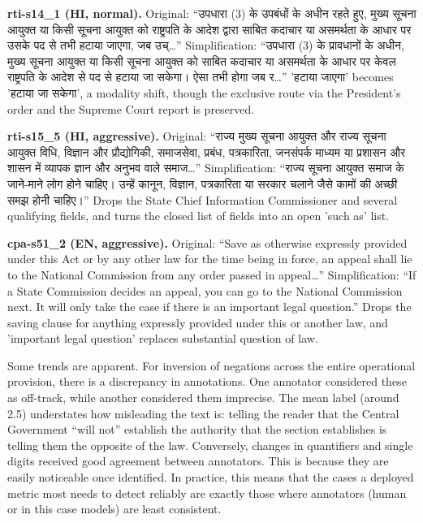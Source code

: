 \documentclass[conference]{IEEEtran}
\newcommand{\dev}[1]{{\devfont #1}}
\begin{document}
{\noindent\textbf{rti-s14\_1 (HI, normal).} Original: “\dev{उपधारा (3) के उपबंधों के अधीन रहते हुए, मुख्य सूचना आयुक्त या किसी सूचना आयुक्त को राष्ट्रपति के आदेश द्वारा साबित कदाचार या असमर्थता के आधार पर उसके पद से तभी हटाया जाएगा, जब उच्}…”  Simplification: “\dev{उपधारा (3) के प्रावधानों के अधीन, मुख्य सूचना आयुक्त या किसी सूचना आयुक्त को साबित कदाचार या असमर्थता के आधार पर केवल राष्ट्रपति के आदेश से पद से हटाया जा सकेगा। ऐसा तभी होगा जब र}…”  '\dev{हटाया जाएगा}' becomes '\dev{हटाया जा सकेगा}', a modality shift, though the exclusive route via the President's order and the Supreme Court report is preserved.

\noindent\textbf{rti-s15\_5 (HI, aggressive).} Original: “\dev{राज्य मुख्य सूचना आयुक्त और राज्य सूचना आयुक्त विधि, विज्ञान और प्रौद्योगिकी, समाजसेवा, प्रबंध, पत्रकारिता, जनसंपर्क माध्यम या प्रशासन और शासन में व्यापक ज्ञान और अनुभव वाले समाज}…”  Simplification: “\dev{राज्य सूचना आयुक्त समाज के जाने-माने लोग होने चाहिए। उन्हें कानून, विज्ञान, पत्रकारिता या सरकार चलाने जैसे कामों की अच्छी समझ होनी चाहिए।}”  Drops the State Chief Information Commissioner and several qualifying fields, and turns the closed list of fields into an open 'such as' list.

\noindent\textbf{cpa-s51\_2 (EN, aggressive).} Original: “Save as otherwise expressly provided under this Act or by any other law for the time being in force, an appeal shall lie to the National Commission from any order passed in appeal…”  Simplification: “If a State Commission decides an appeal, you can go to the National Commission next. It will only take the case if there is an important legal question.”  Drops the saving clause for anything expressly provided under this or another law, and 'important legal question' replaces substantial question of law.

}
Some trends are apparent. For inversion of negations across the entire operational provision, there is a discrepancy in annotations. One annotator considered these as off-track, while another considered them imprecise. The mean label (around 2.5) understates how misleading the text is: telling the reader that the Central Government “will not” establish the authority that the section establishes is telling them the opposite of the law. Conversely, changes in quantifiers and single digits received good agreement between annotators. This is because they are easily noticeable once identified. In practice, this means that the cases a deployed metric most needs to detect reliably are exactly those where annotators (human or in this case models) are least consistent.
\end{document}
